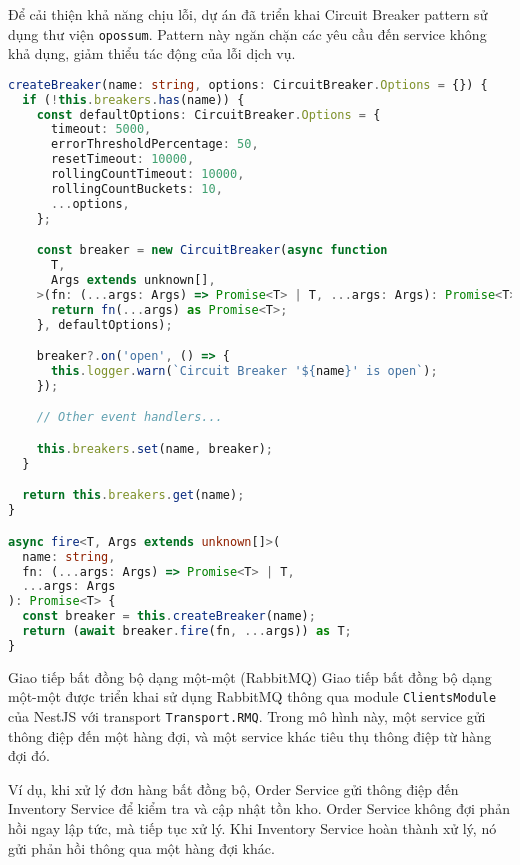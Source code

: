 Để cải thiện khả năng chịu lỗi, dự án đã triển khai Circuit Breaker pattern sử dụng thư viện \texttt{opossum}. Pattern này ngăn chặn các yêu cầu đến service không khả dụng, giảm thiểu tác động của lỗi dịch vụ.

\begin{lstlisting}[language=Typescript]
createBreaker(name: string, options: CircuitBreaker.Options = {}) {
  if (!this.breakers.has(name)) {
    const defaultOptions: CircuitBreaker.Options = {
      timeout: 5000,
      errorThresholdPercentage: 50,
      resetTimeout: 10000,
      rollingCountTimeout: 10000,
      rollingCountBuckets: 10,
      ...options,
    };

    const breaker = new CircuitBreaker(async function 
      T,
      Args extends unknown[],
    >(fn: (...args: Args) => Promise<T> | T, ...args: Args): Promise<T> {
      return fn(...args) as Promise<T>;
    }, defaultOptions);

    breaker?.on('open', () => {
      this.logger.warn(`Circuit Breaker '${name}' is open`);
    });

    // Other event handlers...

    this.breakers.set(name, breaker);
  }

  return this.breakers.get(name);
}

async fire<T, Args extends unknown[]>(
  name: string,
  fn: (...args: Args) => Promise<T> | T,
  ...args: Args
): Promise<T> {
  const breaker = this.createBreaker(name);
  return (await breaker.fire(fn, ...args)) as T;
}
\end{lstlisting}

Giao tiếp bất đồng bộ dạng một-một (RabbitMQ)
Giao tiếp bất đồng bộ dạng một-một được triển khai sử dụng RabbitMQ thông qua module \texttt{ClientsModule} của NestJS với transport \texttt{Transport.RMQ}. Trong mô hình này, một service gửi thông điệp đến một hàng đợi, và một service khác tiêu thụ thông điệp từ hàng đợi đó.

Ví dụ, khi xử lý đơn hàng bất đồng bộ, Order Service gửi thông điệp đến Inventory Service để kiểm tra và cập nhật tồn kho. Order Service không đợi phản hồi ngay lập tức, mà tiếp tục xử lý. Khi Inventory Service hoàn thành xử lý, nó gửi phản hồi thông qua một hàng đợi khác.

